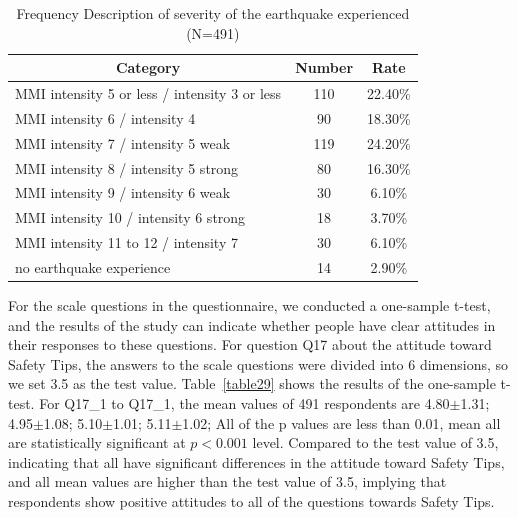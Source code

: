 \begin{table}[h]
  \caption[Frequency Description of severity of the earthquake experienced]{Frequency Description of severity of the earthquake experienced (N=491)}
  \label{table28g}
  \centering
  \begin{tabular}{l|cc}
 \hline
\multicolumn{1}{c|}{Category}&Number&Rate\\
 \hline
MMI intensity 5 or less / intensity 3 or less & 110 & 22.40\% \\
MMI intensity 6 / intensity 4                 & 90  & 18.30\% \\
MMI intensity 7 / intensity 5 weak            & 119 & 24.20\% \\
MMI intensity 8 / intensity 5 strong          & 80  & 16.30\% \\
MMI intensity 9 / intensity 6 weak            & 30  & 6.10\%  \\
MMI intensity 10 / intensity 6 strong                                 & 18  & 3.70\%  \\
MMI intensity 11 to 12 / intensity 7                                  & 30  & 6.10\%  \\
no earthquake experience                                              & 14  & 2.90\%  \\
 \hline
  \end{tabular}
\end{table}

For the scale questions in the questionnaire, we conducted a one-sample t-test, and the results of the study can indicate whether people have clear attitudes in their responses to these questions. For question Q17 about the attitude toward Safety Tips, the answers to the scale questions were divided into 6 dimensions, so we set 3.5 as the test value. Table~\ref{table29} shows the results of the one-sample t-test. For Q17\_1 to Q17\_1, the mean values of 491 respondents are 4.80$\pm$1.31; 4.95$\pm$1.08; 5.10$\pm$1.01; 5.11$\pm$1.02; All of the p values are less than 0.01, mean all are statistically significant at $p<0.001$ level. Compared to the test value of 3.5, indicating that all have significant differences in the attitude toward Safety Tips, and all mean values are higher than the test value of 3.5, implying that respondents show positive attitudes to all of the questions towards Safety Tips. 

